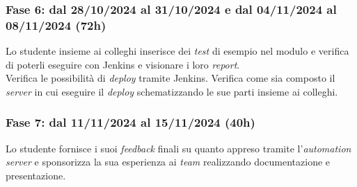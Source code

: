 \subsubsection*{Fase 6: dal 28/10/2024 al 31/10/2024 e dal 04/11/2024 al 08/11/2024 (72h)}
Lo studente insieme ai colleghi inserisce dei \emph{test} di esempio nel modulo e verifica di poterli eseguire con Jenkins e visionare i loro \emph{report}.\\
Verifica le possibilità di \emph{deploy} tramite Jenkins. Verifica come sia composto il \emph{server} in cui eseguire il \emph{deploy} schematizzando le sue parti insieme ai colleghi.\\

\subsubsection*{Fase 7: dal 11/11/2024 al 15/11/2024 (40h) }
Lo studente fornisce i suoi \emph{feedback} finali su quanto appreso tramite l'\emph{automation server} e sponsorizza la sua esperienza ai \emph{team} realizzando documentazione e presentazione.\\

